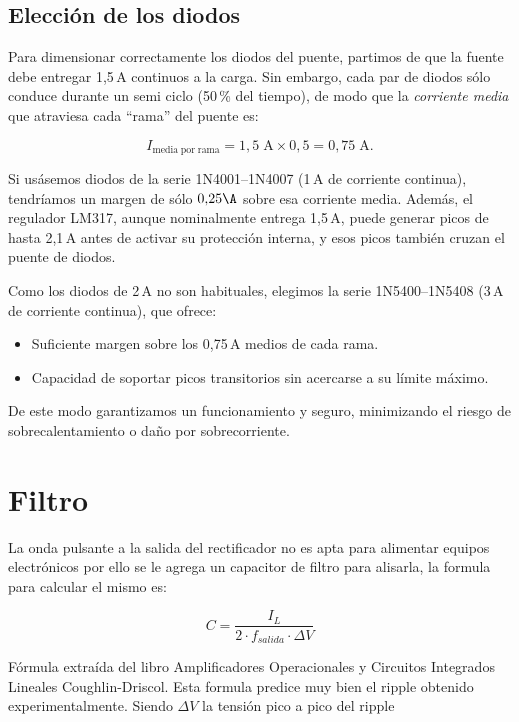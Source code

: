 \subsection{Elección de los diodos}

Para dimensionar correctamente los diodos del puente, partimos de que la fuente debe entregar 1,5\,A continuos a la carga. Sin embargo, cada
par de diodos sólo conduce durante un semi ciclo (50\,\% del tiempo), de modo que la \emph{corriente media} que atraviesa cada “rama” del
puente es:


\begin{equation}
I_{\mathrm{media\;por\;rama}} = 1{,}5\;\mathrm{A} \times 0{,}5 = 0{,}75\;\mathrm{A}.
\end{equation}

Si usásemos diodos de la serie 1N4001–1N4007 (1\,A de corriente continua), tendríamos un margen de sólo $0{,}25\A$ sobre esa
corriente media. Además, el regulador LM317, aunque nominalmente entrega 1,5\,A, puede generar picos de hasta 2,1\,A antes
de activar su protección interna, y esos picos también cruzan el puente de diodos.

Como los diodos de 2\,A no son habituales, elegimos la serie 1N5400–1N5408 (3\,A de corriente continua), que ofrece:

\begin{itemize}
    \item Suficiente margen sobre los 0,75\,A medios de cada rama.
    \item Capacidad de soportar picos transitorios sin acercarse a su límite máximo.
\end{itemize}

De este modo garantizamos un funcionamiento y seguro, minimizando el riesgo de sobrecalentamiento o daño por sobrecorriente.

\section{Filtro}
\label{sec:filtro}
La onda pulsante a la salida del rectificador no es apta para alimentar
equipos electrónicos por ello se le agrega un capacitor de filtro para
alisarla, la formula para calcular el mismo es:

\begin{equation}
  C=\frac{I_L}{2 \cdot f_{salida} \cdot \Delta V}
  \label{eq:filtro}
\end{equation}

Fórmula extraída del libro Amplificadores Operacionales y Circuitos Integrados Lineales Coughlin-Driscol. Esta formula predice
muy bien el ripple obtenido experimentalmente.
Siendo $\Delta V$ la tensión pico a pico del ripple

